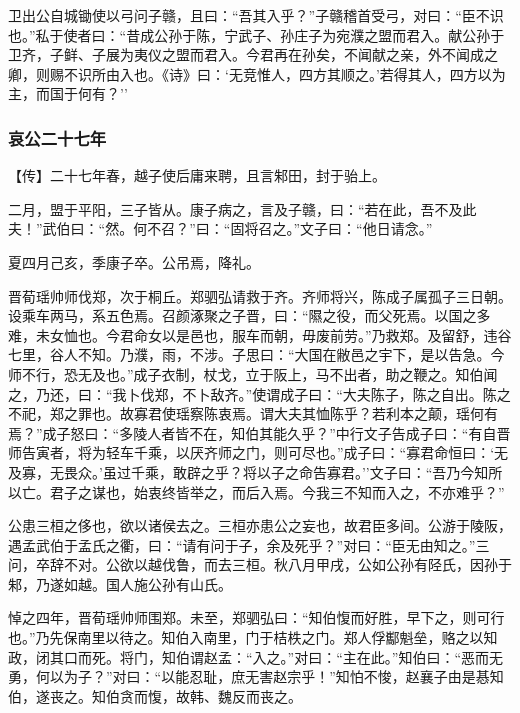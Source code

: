 \documentclass[]{article}
\begin{document}
卫出公自城锄使以弓问子赣，且曰：``吾其入乎？''子赣稽首受弓，对曰：``臣不识也。''私于使者曰：``昔成公孙于陈，宁武子、孙庄子为宛濮之盟而君入。献公孙于卫齐，子鲜、子展为夷仪之盟而君入。今君再在孙矣，不闻献之亲，外不闻成之卿，则赐不识所由入也。《诗》曰：`无竞惟人，四方其顺之。'若得其人，四方以为主，而国于何有？''

\hypertarget{header-n3299}{%
\subsubsection{哀公二十七年}\label{header-n3299}}

【传】二十七年春，越子使后庸来聘，且言邾田，封于骀上。

二月，盟于平阳，三子皆从。康子病之，言及子赣，曰：``若在此，吾不及此夫！''武伯曰：``然。何不召？''曰：``固将召之。''文子曰：``他日请念。''

夏四月己亥，季康子卒。公吊焉，降礼。

晋荀瑶帅师伐郑，次于桐丘。郑驷弘请救于齐。齐师将兴，陈成子属孤子三日朝。设乘车两马，系五色焉。召颜涿聚之子晋，曰：``隰之役，而父死焉。以国之多难，未女恤也。今君命女以是邑也，服车而朝，毋废前劳。''乃救郑。及留舒，违谷七里，谷人不知。乃濮，雨，不涉。子思曰：``大国在敝邑之宇下，是以告急。今师不行，恐无及也。''成子衣制，杖戈，立于阪上，马不出者，助之鞭之。知伯闻之，乃还，曰：``我卜伐郑，不卜敌齐。''使谓成子曰：``大夫陈子，陈之自出。陈之不祀，郑之罪也。故寡君使瑶察陈衷焉。谓大夫其恤陈乎？若利本之颠，瑶何有焉？''成子怒曰：``多陵人者皆不在，知伯其能久乎？''中行文子告成子曰：``有自晋师告寅者，将为轻车千乘，以厌齐师之门，则可尽也。''成子曰：``寡君命恒曰：`无及寡，无畏众。'虽过千乘，敢辟之乎？将以子之命告寡君。''文子曰：``吾乃今知所以亡。君子之谋也，始衷终皆举之，而后入焉。今我三不知而入之，不亦难乎？''

公患三桓之侈也，欲以诸侯去之。三桓亦患公之妄也，故君臣多间。公游于陵阪，遇孟武伯于孟氏之衢，曰：``请有问于子，余及死乎？''对曰：``臣无由知之。''三问，卒辞不对。公欲以越伐鲁，而去三桓。秋八月甲戌，公如公孙有陉氏，因孙于邾，乃遂如越。国人施公孙有山氏。

悼之四年，晋荀瑶帅师围郑。未至，郑驷弘曰：``知伯愎而好胜，早下之，则可行也。''乃先保南里以待之。知伯入南里，门于桔柣之门。郑人俘酅魁垒，赂之以知政，闭其口而死。将门，知伯谓赵孟：``入之。''对曰：``主在此。''知伯曰：``恶而无勇，何以为子？''对曰：``以能忍耻，庶无害赵宗乎！''知怕不悛，赵襄子由是惎知伯，遂丧之。知伯贪而愎，故韩、魏反而丧之。
\end{document}
